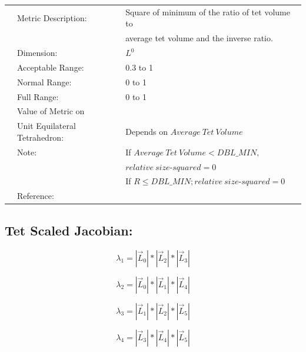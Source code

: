\documentclass[12pt]{article}
\begin{document}
\begin{tabular}{lll}
& Metric Description:  & Square of minimum of the ratio of tet volume to  \\
&                      & average tet volume and the inverse ratio.\\
& Dimension:           & $L^0$  \\ 
& Acceptable Range:    & 0.3 to 1 \\ 
& Normal Range:        & 0 to 1\\ 
& Full Range:          & 0 to 1 \\ 
& Value of Metric on   &  \\
& Unit Equilateral Tetrahedron:    & Depends on $Average ~ Tet ~ Volume$ \\
& Note:                & If $Average~Tet~Volume < DBL\_MIN,$  \\
&                      & $relative~size \textrm{-}squared = 0$ \\ 
&                      & If $R \leq DBL\_MIN; relative~size \textrm{-}squared = 0$ \\
& Reference:           & \cite{three} \\
\end{tabular} 

\subsection*{Tet Scaled Jacobian:}

\begin{displaymath}
\lambda_1 = \left| \vec L_0 \right| *
            \left| \vec L_2 \right| * 
            \left| \vec L_3 \right|  
\end{displaymath}

\begin{displaymath}
\lambda_2 = \left| \vec L_0 \right| *
            \left| \vec L_1 \right| * 
            \left| \vec L_4 \right|  
\end{displaymath}

\begin{displaymath}
\lambda_3 = \left| \vec L_1 \right| *
            \left| \vec L_2 \right| * 
            \left| \vec L_5 \right|  
\end{displaymath}

\begin{displaymath}
\lambda_4 = \left| \vec L_3 \right| *
            \left| \vec L_4 \right| * 
            \left| \vec L_5 \right|  
\end{displaymath}
\end{document}
